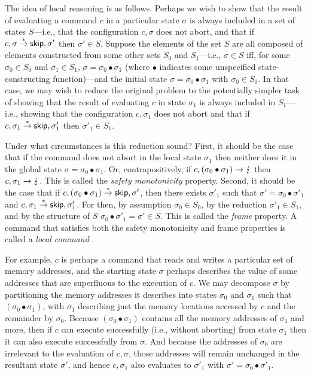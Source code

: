 \documentclass[11pt]{report}         %
\begin{document}
The idea of local reasoning is as follows. Perhaps we wish to show that the result of evaluating a command $c$ in a particular state $\sigma$ is always included in a set of states $S$---i.e., that the configuration $c,\sigma$ does not abort, and that if $c,\sigma \stackrel{\ast}{\rightarrow} \operatorname{\mathsf{skip}},\sigma'$ then $\sigma' \in S$. Suppose the elements of the set $S$ are all composed of elements constructed from some other sets $S_0$ and $S_1$---i.e., $\sigma \in S$ iff, for some $\sigma_0 \in S_0$ and $\sigma_1 \in S_1$, $\sigma = \sigma_0 \bullet \sigma_1$ (where $\bullet$ indicates some unspecified state-constructing function)---and the initial state $\sigma = \sigma_0 \bullet \sigma_1$ with $\sigma_0 \in S_0$. In that case, we may wish to reduce the original problem to the potentially simpler task of showing that the result of evaluating $c$ in state $\sigma_1$ is always included in $S_1$---i.e., showing that the configuration $c,\sigma_1$ does not abort and that if $c,\sigma_1 \stackrel{\ast}{\rightarrow} \operatorname{\mathsf{skip}},\sigma'_1$ then $\sigma'_1 \in S_1$. 

Under what circumstances is this reduction sound? First, it should be the case that if the command does not abort in the local state $\sigma_1$ then neither does it in the global state $\sigma = \sigma_0 \bullet \sigma_1$. Or, contrapositively, if $c,(\sigma_0 \bullet \sigma_1) \rightarrow \lightning$ then $c,\sigma_1 \rightarrow \lightning$. This is called the \emph{safety monotonicity} property. Second, it should be the case that if $c,(\sigma_0 \bullet \sigma_1) \stackrel{\ast}{\rightarrow} \operatorname{\mathsf{skip}},\sigma'$, then there exists $\sigma'_1$ such that $\sigma' = \sigma_0 \bullet \sigma'_1$ and $c,\sigma_1 \stackrel{\ast}{\rightarrow} \operatorname{\mathsf{skip}},\sigma'_1$. For then, by assumption $\sigma_0 \in S_0$, by the reduction $\sigma'_1 \in S_1$, and by the structure of $S$ $\sigma_0 \bullet \sigma'_1 = \sigma' \in S$. This is called the \emph{frame} property. A command that satisfies both the safety monotonicity and frame properties is called a \emph{local command} \cite{DBLP:conf/fossacs/YangO02}. 

For example, $c$ is perhaps a command that reads and writes a particular set of memory addresses, and the starting state $\sigma$ perhaps describes the value of some addresses that are superfluous to the execution of $c$. We may decompose $\sigma$ by partitioning the memory addresses it describes into states $\sigma_0$ and $\sigma_1$ such that $(\sigma_0 \bullet \sigma_1)$, with $\sigma_1$ describing just the memory locations accessed by $c$ and the remainder by $\sigma_0$. Because $(\sigma_0 \bullet \sigma_1)$ contains all the memory addresses of $\sigma_1$ and more, then if $c$ can execute successfully (i.e., without aborting) from state $\sigma_1$ then it can also execute successfully from $\sigma$. And because the addresses of $\sigma_0$ are irrelevant to the evaluation of $c,\sigma$, those addresses will remain unchanged in the resultant state $\sigma'$, and hence $c,\sigma_1$ also evaluates to $\sigma'_1$ with $\sigma' = \sigma_0 \bullet \sigma'_1$. 
\end{document}
